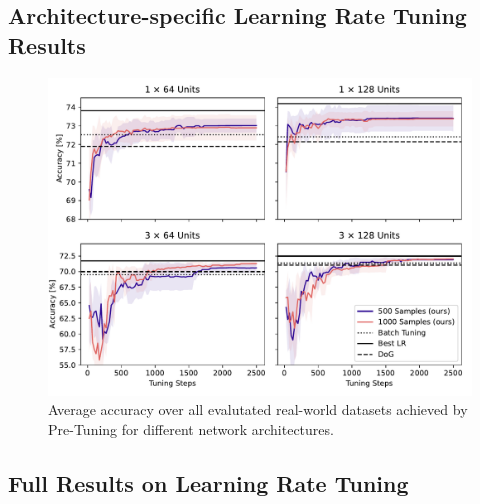 \documentclass{article} %
\begin{document}
\subsection{Architecture-specific Learning Rate Tuning Results}\label{app:tuning_architectures}

\begin{figure}[h]
   \centering
   \includegraphics[width=\textwidth]{figures/pretune_architectures_exp_schedule.pdf}
   \caption{Average accuracy over all evalutated real-world datasets achieved by Pre-Tuning for different network architectures.}
\end{figure}

\newpage
\subsection{Full Results on Learning Rate Tuning}\label{app:tuning_results}
\vfill

\captionsetup{hypcap=false}
\end{document}
